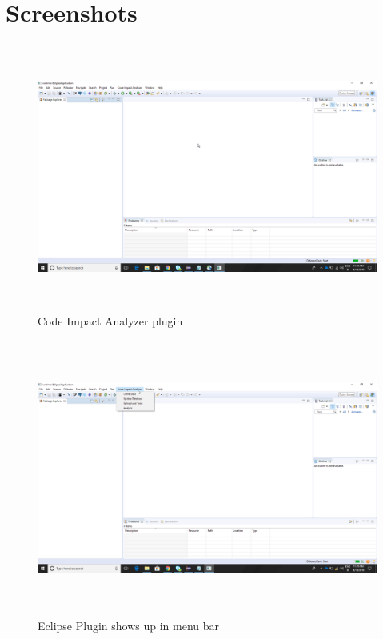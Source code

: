 \documentclass[oneside,a4paper,12pt]{book}
\begin{document}
\newpage
\section{Screenshots}
\begin{figure}[H]
	\begin{Center}
		\includegraphics[width=5.75in,height=3.47in,scale=1.5]{java_kbdgDkZldh.png}
		\caption{Code Impact Analyzer plugin}
		\label{fig:Eclipse Plugin shows up in menu bar}
	\end{Center}
\end{figure}

\newpage
\begin{figure}[H]
	\begin{Center}
		\includegraphics[width=5.75in,height=3.57in,scale=1.5]{java_nbby9ecsUh.png}
		\caption{Eclipse Plugin shows up in menu bar}
		\label{fig:Eclipse Plugin shows up in menu bar}
	\end{Center}
\end{figure}
\end{document}
